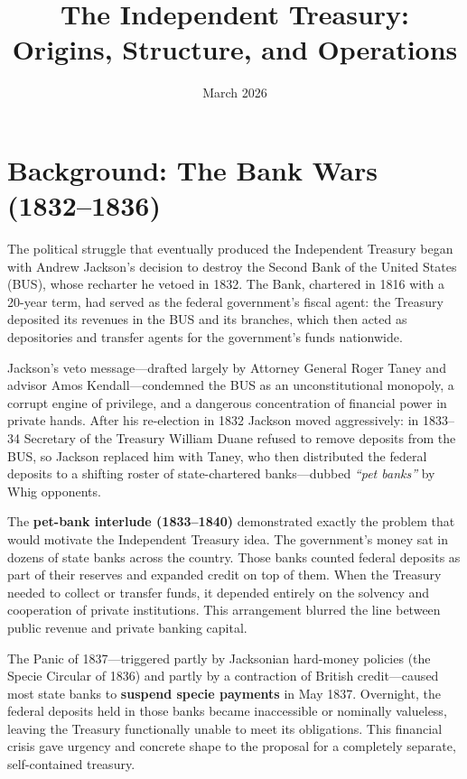 \documentclass[12pt]{article}
\title{The Independent Treasury: Origins, Structure, and Operations}
\author{}
\date{March 2026}
\begin{document}
\maketitle

\tableofcontents
\bigskip

\section{Background: The Bank Wars (1832--1836)}

The political struggle that eventually produced the Independent Treasury
began with Andrew Jackson's decision to destroy the Second Bank of the
United States (BUS), whose recharter he vetoed in 1832.  The Bank,
chartered in 1816 with a 20-year term, had served as the federal
government's fiscal agent: the Treasury deposited its revenues in the
BUS and its branches, which then acted as depositories and transfer
agents for the government's funds nationwide.

Jackson's veto message---drafted largely by Attorney General Roger Taney
and advisor Amos Kendall---condemned the BUS as an unconstitutional
monopoly, a corrupt engine of privilege, and a dangerous concentration
of financial power in private hands.  After his re-election in 1832
Jackson moved aggressively: in 1833--34 Secretary of the Treasury
William Duane refused to remove deposits from the BUS, so Jackson
replaced him with Taney, who then distributed the federal deposits to a
shifting roster of state-chartered banks---dubbed \emph{``pet banks''}
by Whig opponents.

The \textbf{pet-bank interlude (1833--1840)} demonstrated exactly the
problem that would motivate the Independent Treasury idea.  The
government's money sat in dozens of state banks across the country.
Those banks counted federal deposits as part of their reserves and
expanded credit on top of them.  When the Treasury needed to collect or
transfer funds, it depended entirely on the solvency and cooperation of
private institutions.  This arrangement blurred the line between public
revenue and private banking capital.

The Panic of 1837---triggered partly by Jacksonian hard-money policies
(the Specie Circular of 1836) and partly by a contraction of British
credit---caused most state banks to \textbf{suspend specie payments} in
May 1837.  Overnight, the federal deposits held in those banks became
inaccessible or nominally valueless, leaving the Treasury functionally
unable to meet its obligations.  This financial crisis gave urgency and
concrete shape to the proposal for a completely separate, self-contained
treasury.
\end{document}
